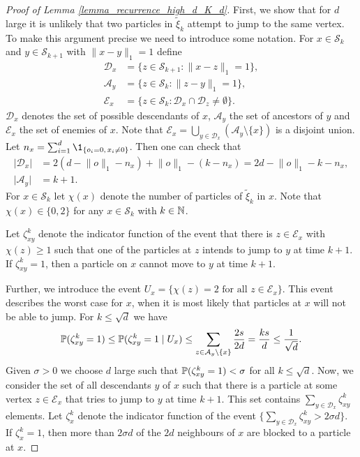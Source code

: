 \begin{proof}[Proof of Lemma \ref{lemma_recurrence_high_d_K_d}]
First, we show that for $d$ large it is unlikely that two particles in $\tilde{\xi}_k$ attempt to jump to the same vertex. To make this argument precise we need to introduce some notation. For $x \in \mathcal{S}_k$ and $y \in \mathcal{S}_{k+1}$ with $\lVert x-y \rVert_1=1$ define 
\begin{align*}
\mathcal{D}_x &= \{z \in \mathcal{S}_{k+1} \colon \lVert x-z\rVert_1 = 1\},\\
\mathcal{A}_y &= \{z \in \mathcal{S}_k \colon \lVert z-y \rVert_1 =1 \},\\
\mathcal{E}_x &= \{z \in \mathcal{S}_k \colon \mathcal{D}_x \cap \mathcal{D}_z \neq \emptyset \}.
\end{align*}
$\mathcal{D}_x$ denotes the set of possible descendants of $x$, $\mathcal{A}_y$ the set of ancestors of $y$ and $\mathcal{E}_x$ the set of enemies of $x$. Note that $\mathcal{E}_x = \bigcup_{y \in \mathcal{D}_x} (\mathcal{A}_y \setminus \{x\})$ is a disjoint union.
Let $n_x=\sum_{i=1}^d \1_{\{o_i=0,\, x_i\neq0\}}$. Then one can check that
\begin{align}\label{proof_recurrence_high_d_K_d_0}
 \lvert \mathcal{D}_x\rvert &= 2(d-\lVert o \rVert_1-n_x) + \lVert o \rVert_1 - (k-n_x) = 2d -\lVert o \rVert_1 - k - n_x,\\
 \lvert \mathcal{A}_y\rvert &= k+1. \nonumber
\end{align}
For $x \in \mathcal{S}_k$ let $\chi(x)$ denote the number of particles of $\tilde{\xi}_k$ in $x$. Note that $\chi(x) \in \{0,2\}$ for any $x \in \mathcal{S}_k$ with $k \in \N$.

Let $\zeta_{xy}^k$ denote the indicator function of the event that there is $z \in \mathcal{E}_x$ with $\chi(z)\geq 1$ such that one of the particles at $z$ intends to jump to $y$ at time $k+1$. If $\zeta_{xy}^k=1$, then a particle on $x$ cannot move to $y$ at time $k+1$.

Further, we introduce the event $U_x= \{\chi(z)=2 \text{ for all } z \in \mathcal{E}_x\}$. This event describes the worst case for $x$, when it is most likely that particles at $x$ will not be able to jump.
For $k \leq \sqrt{d}$ we have
\begin{equation*}
 \P(\zeta_{xy}^k=1) \leq \P(\zeta_{xy}^k=1 \mid U_x) \leq \sum_{z \in \mathcal{A}_y \setminus \{x\}} \frac{2s}{2d} = \frac{ks}{d} \leq \frac{1}{\sqrt{d}}.
\end{equation*}
Given $\sigma > 0$ we choose $d$ large such that $\P(\zeta_{xy}^k=1) < \sigma$ for all $k \leq \sqrt{d}$.
Now, we consider the set of all descendants $y$ of $x$ such that there is a particle at some vertex $z \in \mathcal{E}_x$ that tries to jump to $y$ at time $k+1$. This set contains $\sum_{y \in \mathcal{D}_x} \zeta_{xy}^k$ elements. Let $\zeta_x^k$ denote the indicator function of the event $\bigl\{\sum_{y \in \mathcal{D}_x} \zeta_{xy}^k > 2\sigma d\bigr\}$. If $\zeta_{x}^k=1$, then more than $2\sigma d$ of the $2d$ neighbours of $x$ are blocked to a particle at $x$.


\end{proof}
